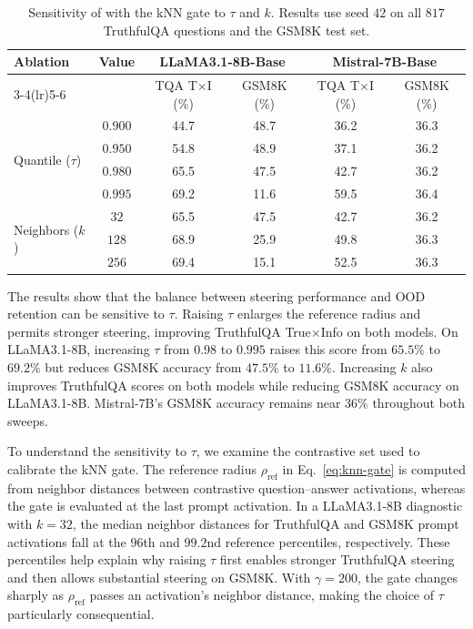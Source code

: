 \begin{table}[ht]
\centering
\small
\caption{Sensitivity of \Cobras with the kNN gate to $\tau$ and $k$. Results use seed $42$ on all $817$ TruthfulQA questions and the GSM8K test set.}
\label{tab:abstain-results}
\begin{tabular}{lccccc}
\toprule
\multirow{2}{*}{Ablation} & \multirow{2}{*}{Value}
& \multicolumn{2}{c}{LLaMA3.1-8B-Base} & \multicolumn{2}{c}{Mistral-7B-Base} \\
\cmidrule(lr){3-4}\cmidrule(lr){5-6}
& & TQA T$\times$I (\%) & GSM8K (\%) & TQA T$\times$I (\%) & GSM8K (\%) \\
\midrule
\multirow{4}{*}{Quantile ($\tau$)}
& $0.900$ & 44.7 & 48.7 & 36.2 & 36.3 \\
& $0.950$ & 54.8 & 48.9 & 37.1 & 36.2 \\
& $0.980$ & 65.5 & 47.5 & 42.7 & 36.2 \\
& $0.995$ & 69.2 & 11.6 & 59.5 & 36.4 \\
\midrule
\multirow{3}{*}{Neighbors ($k$)}
& $32$ & 65.5 & 47.5 & 42.7 & 36.2 \\
& $128$ & 68.9 & 25.9 & 49.8 & 36.3 \\
& $256$ & 69.4 & 15.1 & 52.5 & 36.3 \\
\bottomrule
\end{tabular}
\end{table}

The results show that the balance between steering performance and OOD retention can be sensitive to $\tau$. Raising $\tau$ enlarges the reference radius and permits stronger steering, improving TruthfulQA True$\times$Info on both models. On LLaMA3.1-8B, increasing $\tau$ from $0.98$ to $0.995$ raises this score from $65.5\%$ to $69.2\%$ but reduces GSM8K accuracy from $47.5\%$ to $11.6\%$. Increasing $k$ also improves TruthfulQA scores on both models while reducing GSM8K accuracy on LLaMA3.1-8B. Mistral-7B's GSM8K accuracy remains near $36\%$ throughout both sweeps.

To understand the sensitivity to $\tau$, we examine the contrastive set used to calibrate the kNN gate. The reference radius $\rho_{\mathrm{ref}}$ in Eq.~\eqref{eq:knn-gate} is computed from neighbor distances between contrastive question--answer activations, whereas the gate is evaluated at the last prompt activation. In a LLaMA3.1-8B diagnostic with $k=32$, the median neighbor distances for TruthfulQA and GSM8K prompt activations fall at the $96$th and $99.2$nd reference percentiles, respectively. These percentiles help explain why raising $\tau$ first enables stronger TruthfulQA steering and then allows substantial steering on GSM8K. With $\gamma=200$, the gate changes sharply as $\rho_{\mathrm{ref}}$ passes an activation's neighbor distance, making the choice of $\tau$ particularly consequential.

